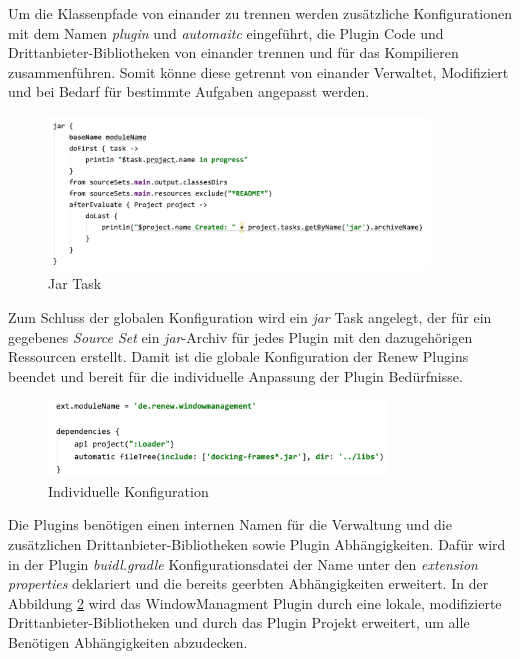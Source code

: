  	Um die Klassenpfade von einander zu trennen werden zusätzliche Konfigurationen mit dem Namen \textit{plugin} und \textit{automaitc} eingeführt, die Plugin Code und Drittanbieter-Bibliotheken von einander trennen und für das Kompilieren zusammenführen. Somit könne diese getrennt von einander Verwaltet, Modifiziert und bei Bedarf für bestimmte Aufgaben angepasst werden.\bigbreak

	\begin{figure}[h!]
	  \centering
	  \includegraphics[width=0.9\textwidth]{material/images/jar.png}
	  \caption{Jar Task}
	  \label{fig:jar}
	\end{figure}

	Zum Schluss der globalen Konfiguration wird ein \textit{jar} Task angelegt, der für ein gegebenes \textit{Source Set} ein \textit{jar}-Archiv für jedes Plugin mit den dazugehörigen Ressourcen erstellt. \newline
	Damit ist die globale Konfiguration der Renew Plugins beendet und bereit für die individuelle Anpassung der Plugin Bedürfnisse.\bigbreak

	\begin{figure}[h!]
	  \centering
	  \includegraphics[width=0.8\textwidth]{material/images/windmang.png}
	  \caption{Individuelle Konfiguration}
	  \label{fig:windmang}
	\end{figure}

	Die Plugins benötigen einen internen Namen für die Verwaltung und die zusätzlichen Drittanbieter-Bibliotheken sowie Plugin Abhängigkeiten. Dafür wird in der Plugin \textit{buidl.gradle} Konfigurationsdatei der Name unter den \textit{extension properties} deklariert und die bereits geerbten Abhängigkeiten erweitert. In der Abbildung \ref{fig:windmang} wird das WindowManagment Plugin durch eine lokale, modifizierte Drittanbieter-Bibliotheken  und durch das Plugin Projekt erweitert, um alle Benötigen Abhängigkeiten abzudecken.\bigbreak

